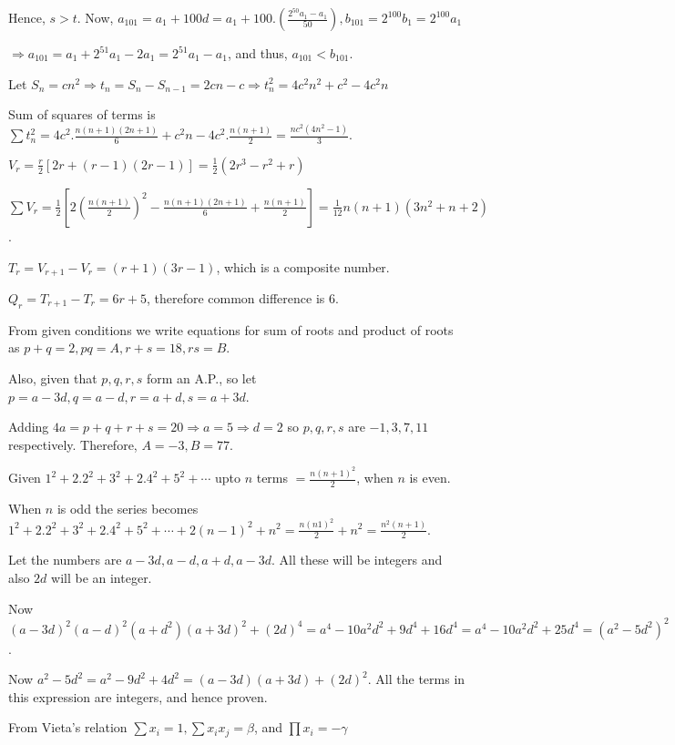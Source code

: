   Hence, $s > t$. Now, $a_{101} = a_1 + 100d = a_1 + 100.\left(\frac{2^{50}a_1 - a_1}{50}\right), b_{101} =
  2^{100}b_1 = 2^{100}a_1$

  $\Rightarrow a_{101} = a_1 + 2^{51}a_1 - 2a_1 = 2^{51}a_1 - a_1$, and thus, $a_{101} < b_{101}$.
\item Let $S_n = cn^2 \Rightarrow t_n = S_n - S_{n - 1} = 2cn - c\Rightarrow t_n^2 = 4c^2n^2 + c^2 - 4c^2n$

  Sum of squares of terms is $\sum t_n^2 = 4c^2.\frac{n(n + 1)(2n + 1)}{6} + c^2n - 4c^2.\frac{n(n + 1)}{2}
  = \frac{nc^2(4n^2 - 1)}{3}$.
\item $V_r = \frac{r}{2}[2r + (r - 1)(2r - 1)] = \frac{1}{2}(2r^3 - r^2 + r)$

  $\sum V_r = \frac{1}{2}\left[2\left(\frac{n(n + 1)}{2}\right)^2 - \frac{n(n + 1)(2n + 1)}{6} + \frac{n(n +
    1)}{2}\right] = \frac{1}{12}n(n + 1)(3n^2 + n + 2)$.

  $T_r = V_{r + 1} - V_r = (r + 1)(3r - 1)$, which is a composite number.

  $Q_r = T_{r + 1} - T_r = 6r + 5$, therefore common difference is $6$.
\item From given conditions we write equations for sum of roots and product of roots as $p + q = 2, pq = A,
  r + s = 18, rs = B$.

  Also, given that $p, q, r, s$ form an A.P., so let $p = a - 3d, q = a - d, r = a + d, s = a + 3d$.

  Adding $4a = p + q + r + s = 20 \Rightarrow a = 5 \Rightarrow d = 2$ so $p, q, r, s$ are $-1, 3, 7, 11$
  respectively. Therefore, $A = -3, B = 77$.
\item Given $1^2 + 2.2^2 + 3^2 + 2.4^2 + 5^2 + \cdots$ upto $n$ terms $= \frac{n(n + 1)^2}{2}$, when $n$ is
  even.

  When $n$ is odd the series becomes $1^2 + 2.2^2 + 3^2 + 2.4^2 + 5^2 + \cdots + 2(n - 1)^2 + n^2
  = \frac{n(n  1)^2}{2} + n^2 = \frac{n^2(n + 1)}{2}$.
\item Let the numbers are $a - 3d, a - d, a + d, a - 3d$. All these will be integers and also $2d$ will be
  an integer.

  Now $(a - 3d)^2(a - d)^2(a + d^2)(a + 3d)^2 + (2d)^4 = a^4 - 10a^2d^2 + 9d^4 + 16d^4 = a^4 - 10a^2d^2 +
  25d^4 = (a^2 - 5d^2)^2$.

  Now $a^2 - 5d^2 = a^2 - 9d^2 + 4d^2 = (a - 3d)(a + 3d) + (2d)^2$. All the terms in this expression are
  integers, and hence proven.
\item From Vieta's relation $\sum x_i = 1, \sum x_ix_j = \beta$, and $\prod x_i = -\gamma$

